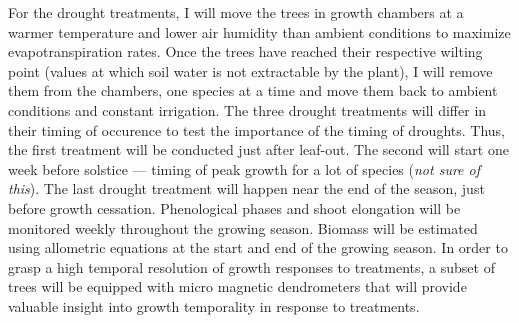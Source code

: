 \documentclass[12pt]{article}
\begin{document}
For the drought treatments, I will move the trees in growth chambers at a warmer temperature and lower air humidity than ambient conditions to maximize evapotranspiration rates. Once the trees have reached their respective wilting point (values at which soil water is not extractable by the plant), I will remove them from the chambers, one species at a time and move them back to ambient conditions and constant irrigation. The three drought treatments will differ in their timing of occurence to test the importance of the timing of droughts. Thus, the first treatment will be conducted just after leaf-out. The second will start one week before solstice --- timing of peak growth for a lot of species (\textit{not sure of this}). The last drought treatment will happen near the end of the season, just before growth cessation. Phenological phases and shoot elongation will be monitored weekly throughout the growing season. Biomass will be estimated using allometric equations at the start and end of the growing season. In order to grasp a high temporal resolution of growth responses to treatments, a subset of trees will be equipped with micro magnetic dendrometers that will provide valuable insight into growth temporality in response to treatments. \\
\end{document}
